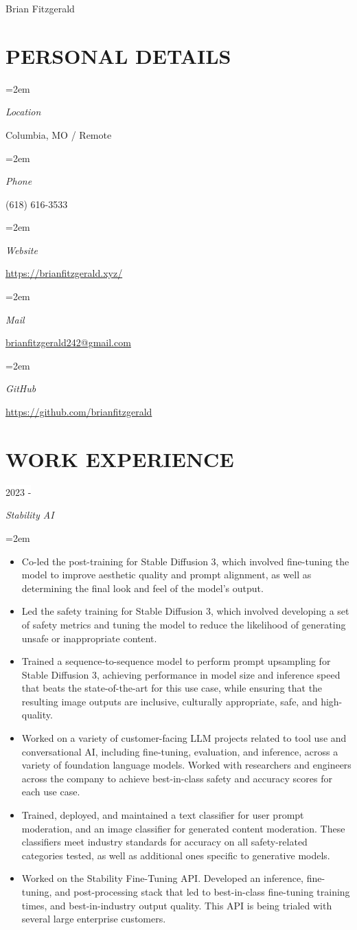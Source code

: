 \documentclass[paper=a4,fontsize=9pt]{scrartcl} %
\newlength{\spacebox}
\newcommand{\sepspace}{\vspace*{0.8em}}		%
\newcommand{\MyName}[1]{ %
			\Huge \usefont{OT1}{phv}{b}{n} \hfill #1
			\par \normalsize \normalfont}
\newcommand{\NewPart}[1]{\section*{\uppercase{#1}}}
\newcommand{\PersonalEntry}[2]{
			\noindent\hangindent=2em\hangafter=0 %
			\parbox{\spacebox}{        %
			\textit{#1}}		       %
			\hspace{1.5em} #2 \par}    %
\newcommand{\EducationEntry}[4]{
			\noindent {#1} \hfill      %
			\colorbox{Black}{%
				\parbox{6em}{%
				\hfill\color{White}#2}} \par  %
			\noindent \textit{#3} \par        %
			\noindent\hangindent=2em\hangafter=0 \small #4 %
			\normalsize \par}
\newcommand{\WorkEntry}[4]{				  %
			\noindent {#1} \hfill      %
			\colorbox{White}{\color{Black}#2} \par  %
			\noindent \textit{#3} \par              %
			\noindent\hangindent=2em\hangafter=0 \small #4 %
			\normalsize \par}
\begin{document}
	\MyName{Brian Fitzgerald}

	\sepspace

	\NewPart{Personal details}{}

	\PersonalEntry{Location}{Columbia, MO / Remote}
	\PersonalEntry{Phone}{(618) 616-3533}
	\PersonalEntry{Website}{\url{https://brianfitzgerald.xyz/}}
	\PersonalEntry{Mail}{\url{brianfitzgerald242@gmail.com}}
	\PersonalEntry{GitHub}{\url{https://github.com/brianfitzgerald}}

	\NewPart{Work experience}{}

	\WorkEntry{ML Research Engineer}{2023 - }{Stability AI}{
		\begin{itemize}
			\item Co-led the post-training for Stable Diffusion 3, which involved fine-tuning the model to improve aesthetic quality and prompt alignment, as well as determining the final look and feel of the model's output.
			\item Led the safety training for Stable Diffusion 3, which involved developing a set of safety metrics and tuning the model to reduce the likelihood of generating unsafe or inappropriate content.
			\item Trained a sequence-to-sequence model to perform prompt upsampling for Stable Diffusion 3, achieving performance in model size and inference speed that beats the state-of-the-art for this use case, while ensuring that the resulting image outputs are inclusive, culturally appropriate, safe, and high-quality.
			\item Worked on a variety of customer-facing LLM projects related to tool use and conversational AI, including fine-tuning, evaluation, and inference, across a variety of foundation language models. Worked with researchers and engineers across the company to achieve best-in-class safety and accuracy scores for each use case.
			\item Trained, deployed, and maintained a text classifier for user prompt moderation, and an image classifier for generated content moderation. These classifiers meet industry standards for accuracy on all safety-related categories tested, as well as additional ones specific to generative models.
			\item Worked on the Stability Fine-Tuning API. Developed an inference, fine-tuning, and post-processing stack that led to best-in-class fine-tuning training times, and best-in-industry output quality. This API is being trialed with several large enterprise customers.
		\end{itemize}
	}
	\sepspace
\end{document}
